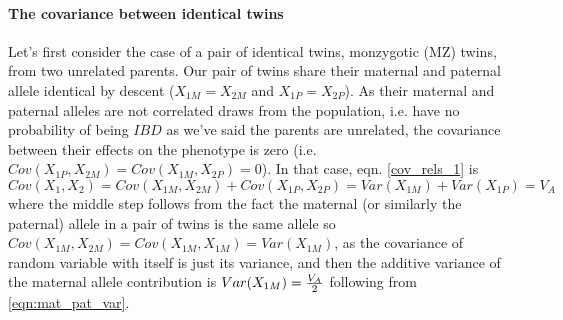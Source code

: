 \paragraph{The covariance between identical twins}
Let's first consider the case of a pair of identical twins, monzygotic
(MZ) twins, from two
unrelated parents. Our pair of twins share their maternal and paternal
allele identical by descent ($X_{1M}=X_{2M}$ and $X_{1P}=X_{2P}$). As their maternal and
paternal alleles are not correlated draws from the population,
i.e. have no probability of being $IBD$ as we've said the parents are unrelated, the
covariance between their effects on the phenotype is zero  
(i.e. $Cov(X_{1P},X_{2M})=Cov(X_{1M},X_{2P})=0$). In that case,
eqn. \ref{cov_rels_1} is
\begin{equation}
Cov(X_1,X_2) = Cov(X_{1M},X_{2M})+Cov(X_{1P},X_{2P}) = Var(X_{1M}) +Var(X_{1P})
= V_A
\end{equation}
where the middle step follows from the fact the maternal (or similarly
the paternal) allele in
a pair of twins is the same allele so
$Cov(X_{1M},X_{2M})=Cov(X_{1M},X_{1M})=Var(X_{1M})$, as the
covariance of random variable with itself is just its variance, and
then the additive variance of the maternal allele contribution is
$Var(X_{1M})=\nicefrac{V_A}{2}$ following from \eqn \eqref{eqn:mat_pat_var}. \\

